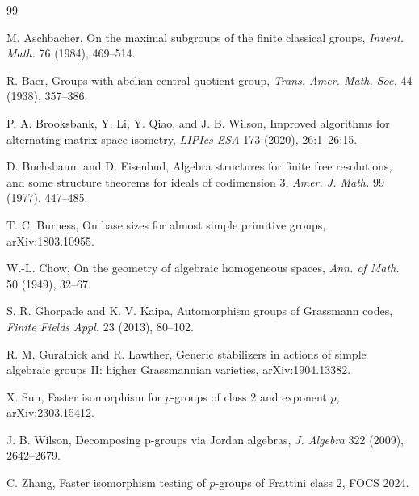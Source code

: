 \documentclass[11pt]{article}
\begin{document}
\begin{thebibliography}{99}

M. Aschbacher, On the maximal subgroups of the finite classical groups, \emph{Invent. Math.} 76 (1984), 469--514.

R. Baer, Groups with abelian central quotient group, \emph{Trans. Amer. Math. Soc.} 44 (1938), 357--386.

P. A. Brooksbank, Y. Li, Y. Qiao, and J. B. Wilson, Improved algorithms for alternating matrix space isometry, \emph{LIPIcs ESA} 173 (2020), 26:1--26:15.

D. Buchsbaum and D. Eisenbud, Algebra structures for finite free resolutions, and some structure theorems for ideals of codimension $3$, \emph{Amer. J. Math.} 99 (1977), 447--485.

T. C. Burness, On base sizes for almost simple primitive groups, arXiv:1803.10955.

W.-L. Chow, On the geometry of algebraic homogeneous spaces, \emph{Ann. of Math.} 50 (1949), 32--67.

S. R. Ghorpade and K. V. Kaipa, Automorphism groups of Grassmann codes, \emph{Finite Fields Appl.} 23 (2013), 80--102.

R. M. Guralnick and R. Lawther, Generic stabilizers in actions of simple algebraic groups II: higher Grassmannian varieties, arXiv:1904.13382.

X. Sun, Faster isomorphism for $p$-groups of class $2$ and exponent $p$, arXiv:2303.15412.

J. B. Wilson, Decomposing p-groups via Jordan algebras, \emph{J. Algebra} 322 (2009), 2642--2679.

C. Zhang, Faster isomorphism testing of $p$-groups of Frattini class $2$, FOCS 2024.

\end{thebibliography}
\end{document}
